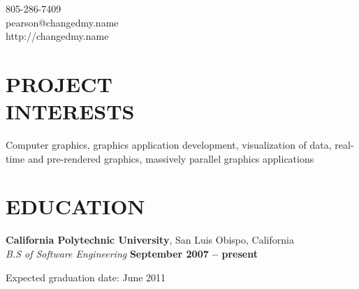 \documentclass[margin,line]{resume}
\begin{document}
{
    \sc
    \hfill 805-286-7409                   \vspace{0mm}\\\vspace{0mm}%
    \hfill pearson@changedmy.name         \vspace{0mm}\\\vspace{0mm}%
    \hfill http://changedmy.name          \vspace{0mm}\\\vspace{-10mm}%
}

\begin{resume}

\vspace{6mm}

    \section{\mysidestyle \textbf{\large{P}\small{ROJECT\\INTERESTS}}}

  Computer graphics, graphics application development, visualization of data, real-time and pre-rendered graphics, massively parallel graphics applications

\sectionline

    \section{\mysidestyle \textbf{\large{E}\small{DUCATION}}}

    \textbf{\listing California Polytechnic University}, San Luis Obispo, California \vspace{2mm}\\\vspace{1mm}%
    \textsl{B.S of Software Engineering} \hfill \textbf{ September 2007 -- present}\vspace{-3mm}\\\vspace{-1mm}%
    \begin{list2}
        \item Expected graduation date: June 2011
    \end{list2}\vspace{-1.5mm}



\end{resume}
\end{document}
